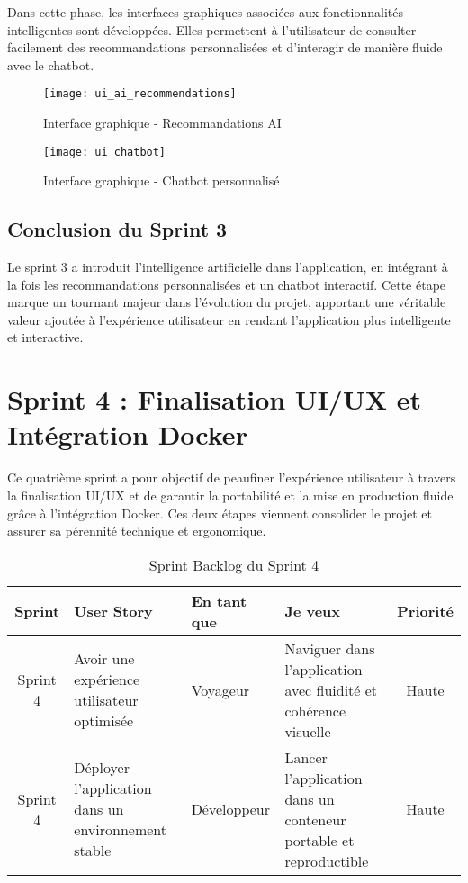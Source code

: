 Dans cette phase, les interfaces graphiques associées aux fonctionnalités intelligentes sont développées. 
Elles permettent à l’utilisateur de consulter facilement des recommandations personnalisées 
et d’interagir de manière fluide avec le chatbot.

\begin{figure}[H]
    \centering
    \texttt{[image: ui\_ai\_recommendations]}
    \caption{Interface graphique - Recommandations AI}
    
    \centering
    \texttt{[image: ui\_chatbot]}
    \caption{Interface graphique - Chatbot personnalisé}
\end{figure}

\subsection*{Conclusion du Sprint 3}

Le sprint 3 a introduit l’intelligence artificielle dans l’application, 
en intégrant à la fois les recommandations personnalisées et un chatbot interactif. 
Cette étape marque un tournant majeur dans l’évolution du projet, 
apportant une véritable valeur ajoutée à l’expérience utilisateur 
en rendant l’application plus intelligente et interactive.


\section{Sprint 4 : Finalisation UI/UX et Intégration Docker}

Ce quatrième sprint a pour objectif de peaufiner l’expérience utilisateur à travers la finalisation UI/UX et de garantir la portabilité et la mise en production fluide 
grâce à l’intégration Docker.  
Ces deux étapes viennent consolider le projet et assurer sa pérennité technique et ergonomique.

\begin{table}[H]
\centering
\begin{tabular}{|c|l|l|l|c|}
\hline
\textbf{Sprint} & \textbf{User Story} & \textbf{En tant que} & \textbf{Je veux} & \textbf{Priorité} \\
\hline
Sprint 4 & Avoir une expérience utilisateur optimisée & Voyageur & Naviguer dans l’application avec fluidité et cohérence visuelle & Haute \\
\hline
Sprint 4 & Déployer l’application dans un environnement stable & Développeur & Lancer l’application dans un conteneur portable et reproductible & Haute \\
\hline
\end{tabular}
\caption{Sprint Backlog du Sprint 4}
\end{table}

